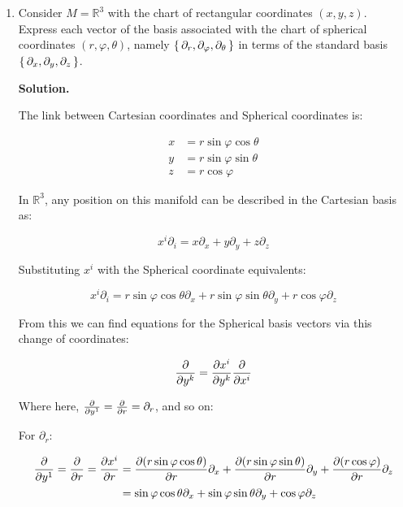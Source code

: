 \documentclass[10pt]{article}
\begin{document}
\begin{enumerate}[start=1,label={\bfseries Exercise \arabic*:},leftmargin=1in]
        



    \bigskip
    \item Consider \(M = \mathbb{R}^3\) with the chart of rectangular coordinates \((x,y,z)\). Express each vector of the basis associated with the chart of spherical coordinates \((r, \varphi, \theta)\), namely \(\set{\partial_r, \partial_{\varphi}, \partial_{\theta}}\) in terms of the standard basis \(\set{\partial_x, \partial_y, \partial_z}\).

        \textbf{Solution.}

        The link between Cartesian coordinates and Spherical coordinates is:

        \begin{align*}
            x &= r \sin{\varphi} \cos{\theta} \\
            y &= r \sin{\varphi} \sin{\theta} \\
            z &= r \cos{\varphi}
        \end{align*} 

        In \(\mathbb{R}^3\), any position on this manifold can be described in the Cartesian basis as: 

        \begin{equation*}
            x^i \partial_i = x \partial_x + y \partial_y + z \partial_z
        \end{equation*}

        Substituting \(x^i\) with the Spherical coordinate equivalents:

        \begin{equation*}
            x^i \partial_i = r \sin{\varphi} \cos{\theta} \partial_x + r \sin{\varphi} \sin{\theta} \partial_y + r \cos{\varphi} \partial_z  
        \end{equation*}

        From this we can find equations for the Spherical basis vectors via this change of coordinates:

        \begin{equation*}
            \pdv{y^k} = \pdv{x^i}{y^k} \pdv{x^i} 
        \end{equation*}

        Where here, \( \pdv{y^1} = \pdv{r} = \partial_r\), and so on:

        For \(\partial_r\):

        \begin{align*}
            \pdv{y^1} = \pdv{r} = \pdv{x^i}{r} &= \pdv{(r \sin{\varphi} \cos{\theta})}{r} \partial_x + \pdv{(r \sin{\varphi} \sin{\theta})}{r} \partial_y + \pdv{(r \cos{\varphi})}{r} \partial_z \\
                                               &= \sin{\varphi} \cos{\theta} \partial_x + \sin{\varphi} \sin{\theta} \partial_y + \cos{\varphi} \partial_z
        \end{align*}
        

\end{enumerate}
\end{document}
